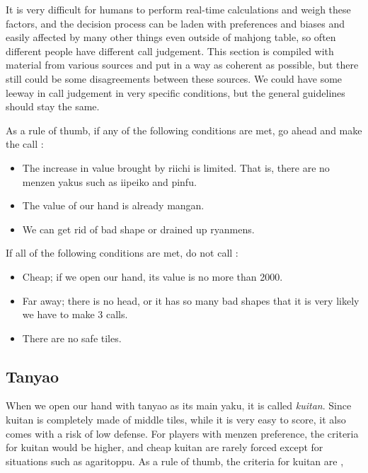 \documentclass[12pt]{article}
\begin{document}
It is very difficult for humans to perform real-time calculations and weigh these factors, and the decision process can be laden with preferences and biases and easily affected by many other things even outside of mahjong table, so often different people have different call judgement. This section is compiled with material from various sources and put in a way as coherent as possible, but there still could be some disagreements between these sources. We could have some leeway in call judgement in very specific conditions, but the general guidelines should stay the same.

As a rule of thumb, if any of the following conditions are met, go ahead and make the call \citep[][pp.~36--41, p.~45, pp.~58--61]{hirasawa-naki}:

\begin{itemize}
  \item The increase in value brought by riichi is limited. That is, there are no menzen yakus such as iipeiko and pinfu.
  \item The value of our hand is already mangan.
  \item We can get rid of bad shape or drained up ryanmens.
\end{itemize}

If all of the following conditions are met, do not call :

\begin{itemize}
\item Cheap; if we open our hand, its value is no more than 2000.
\item Far away; there is no head, or it has so many bad shapes that it is very likely we have to make 3 calls.
\item There are no safe tiles.
\end{itemize}


\subsection{Tanyao}

When we open our hand with tanyao as its main yaku, it is called \textit{kuitan}. Since kuitan is completely made of middle tiles, while it is very easy to score, it also comes with a risk of low defense. For players with menzen preference, the criteria for kuitan would be higher, and cheap kuitan are rarely forced except for situations such as agaritoppu. As a rule of thumb, the criteria for kuitan are ,
\end{document}
